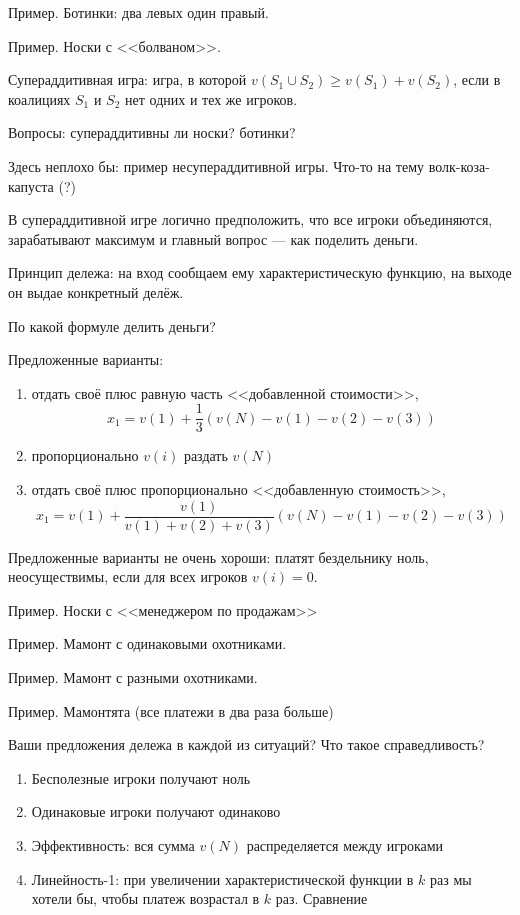 \documentclass[pdftex,12pt,a4paper]{article}
\begin{document}
Пример. Ботинки: два левых один правый.


Пример. Носки с <<болваном>>.


Супераддитивная игра: игра, в которой $v(S_1 \cup S_2)\geq v(S_1)+v(S_2)$, если в коалициях $S_1$ и $S_2$ нет одних и тех же игроков. 


Вопросы: супераддитивны ли носки? ботинки? 


Здесь неплохо бы: пример несупераддитивной игры. Что-то на тему волк-коза-капуста (?)


В супераддитивной игре логично предположить, что все игроки объединяются, зарабатывают максимум и главный вопрос --- как поделить деньги.


Принцип дележа: на вход сообщаем ему характеристическую функцию, на выходе он выдае конкретный делёж.


По какой формуле делить деньги?


Предложенные варианты: 
\begin{enumerate}
\item отдать своё плюс равную часть <<добавленной стоимости>>, 
\begin{equation}
x_1=v(1)+\frac{1}{3}(v(N)-v(1)-v(2)-v(3))
\end{equation}
\item пропорционально $v(i)$ раздать $v(N)$
\item отдать своё плюс пропорционально <<добавленную стоимость>>, 
\begin{equation}
x_1=v(1)+\frac{v(1)}{v(1)+v(2)+v(3)}(v(N)-v(1)-v(2)-v(3))
\end{equation}
\end{enumerate}

Предложенные варианты не очень хороши: платят бездельнику ноль, неосуществимы, если для всех игроков $v(i)=0$.


Пример. Носки с <<менеджером по продажам>>


Пример. Мамонт с одинаковыми охотниками.


Пример. Мамонт с разными охотниками.


Пример. Мамонтята (все платежи в два раза больше)

Ваши предложения дележа в каждой из ситуаций? Что такое справедливость?


\begin{enumerate}
\item Бесполезные игроки получают ноль
\item Одинаковые игроки получают одинаково
\item Эффективность: вся сумма $v(N)$ распределяется между игроками
\item Линейность-1: при увеличении характеристической функции в $k$ раз мы хотели бы, чтобы платеж возрастал в $k$ раз. Сравнение 
\end{enumerate}
\end{document}
